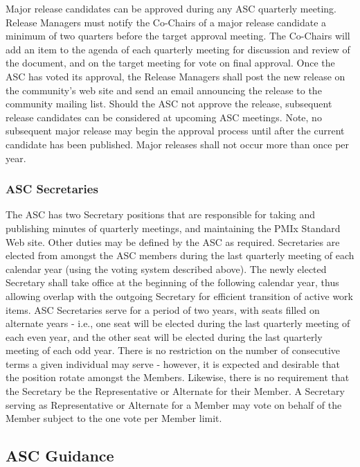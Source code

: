 \documentclass{article}
\begin{document}
Major release candidates can be approved during any ASC quarterly
meeting. Release Managers must notify the Co-Chairs of a major release
candidate a minimum of two quarters before the target approval
meeting. The Co-Chairs will add an item to the agenda of each quarterly
meeting for discussion and review of the document, and on the target
meeting for vote on final approval. Once the ASC has voted its approval,
the Release Managers shall post the new release on the community's web
site and send an email announcing the release to the community mailing
list. Should the ASC not approve the release, subsequent release
candidates can be considered at upcoming ASC meetings. Note, no
subsequent major release may begin the approval process until after the
current candidate has been published. Major releases shall not occur
more than once per year.

\hypertarget{asc-secretaries}{%
\subsubsection{ASC Secretaries}%
\label{asc-secretaries}}

The ASC has two Secretary positions that are responsible for taking and publishing minutes of
quarterly meetings, and maintaining the PMIx Standard Web site. Other
duties may be defined by the ASC as required. Secretaries are elected
from amongst the ASC members during the last quarterly meeting of each
calendar year (using the voting system described above). The newly
elected Secretary shall take office at the beginning of the following
calendar year, thus allowing overlap with the outgoing Secretary for
efficient transition of active work items. ASC Secretaries serve for a
period of two years, with seats filled on alternate years - i.e., one
seat will be elected during the last quarterly meeting of each even
year, and the other seat will be elected during the last quarterly
meeting of each odd year. There is no restriction on the number of
consecutive terms a given individual may serve - however, it is expected
and desirable that the position rotate amongst the Members. Likewise,
there is no requirement that the Secretary be the Representative or
Alternate for their Member. A Secretary serving as Representative or
Alternate for a Member may vote on behalf of the Member subject to the
one vote per Member limit.

\hypertarget{asc-guidance}{%
\subsection{ASC Guidance}%
\label{asc-guidance}}
\end{document}
